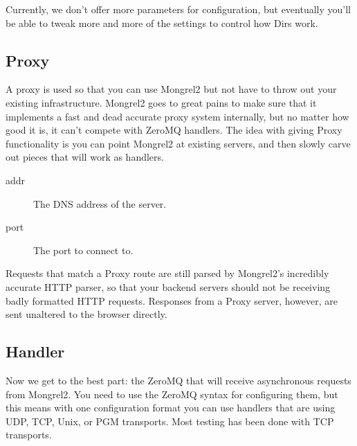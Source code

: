 Currently, we don't offer more parameters for configuration, but eventually you'll be able to tweak more and
more of the settings to control how Dirs work.

\subsection{Proxy}

A proxy is used so that you can use Mongrel2 but not have to throw out your
existing infrastructure.  Mongrel2 goes to great pains to make sure that it
implements a fast and dead accurate proxy system internally, but no matter how
good it is, it can't compete with ZeroMQ handlers.  The idea with giving Proxy
functionality is you can point Mongrel2 at existing servers, and then slowly
carve out pieces that will work as handlers.


\begin{description}
\item[addr] The DNS address of the server.
\item[port] The port to connect to.
\end{description}

Requests that match a Proxy route are still parsed by Mongrel2's incredibly accurate
HTTP parser, so that your backend servers should not be receiving badly formatted
HTTP requests.  Responses from a Proxy server, however, are sent unaltered to the
browser directly.


\subsection{Handler}

Now we get to the best part: the ZeroMQ  that will receive asynchronous requests
from Mongrel2.  You need to use the ZeroMQ syntax for configuring them, but this means with one
configuration format you can use handlers that are using UDP, TCP, Unix, or PGM transports.  Most
testing has been done with TCP transports.

